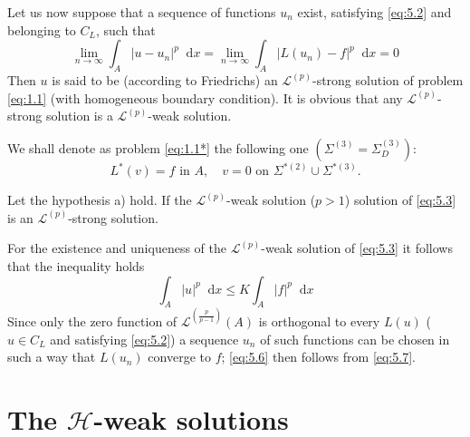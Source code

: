 \documentclass[a4paper,12pt,leqno]{article}
\numberwithin{equation}{section}
\newenvironment{thm}[1]
{\renewcommand\theinnerproblem{#1}\innerproblem}
{\endinnerproblem}
\newcommand{\dd}{\mathop{}\!\mathrm{d}}
\begin{document}
Let us now suppose that a sequence of functions $u_{n}$ exist, satisfying \eqref{eq:5.2} and belonging to $C_{L}$, such that
\begin{equation}
	\label{eq:5.6}
	\lim _{n \rightarrow \infty} \int_{A}\left|u-u_{n}\right|^{p} \dd x=\lim _{n \rightarrow \infty} \int_{A}|L(u_n)-f|^{p} \dd x=0
\end{equation}
Then $u$ is said to be (according to Friedrichs) an $\mathscr{L}^{(p)}$-strong solution of problem \eqref{eq:1.1} (with homogeneous boundary condition). It is obvious that any $\mathscr{L}^{(p)}$-strong solution is a $\mathscr{L}^{(p)}$-weak solution.

We shall denote as problem \eqref{eq:1.1*} the following one $(\Sigma^{(3)}=\Sigma_{D}^{(3)})$:
\begin{equation}
	\label{eq:1.1*}
	\tag{$1.1^*$}
	L^*(v) = f \text{ in } A,
	\quad 
	v = 0 \text{ on } \Sigma^{*(2)} \cup \Sigma^{*(3)}.
\end{equation}

\begin{thm}{XIX} \label{XIX}
	Let the hypothesis a) hold. If the $\mathscr{L}^{(p)}$-weak solution ($p>1$) solution of \eqref{eq:5.3} is an $\mathscr{L}^{(p)}$-strong solution.
\end{thm}

For the existence and uniqueness of the $\mathscr{L}^{(p)}$-weak solution of \eqref{eq:5.3} it follows that the inequality holds
\begin{equation}
	\label{eq:5.7}
	\int_{A}|u|^{p} \dd x \leq K \int_{A}|f|^{p} \dd x
\end{equation}
Since only the zero function of $\mathscr{L}^{\left(\frac{p}{p-1}\right)}(A)$ is orthogonal to every $L(u)$ ($u \in C_{L}$ and satisfying \eqref{eq:5.2}) a sequence $u_{n}$ of such functions can be chosen in such a way that $L\left(u_{n}\right)$ converge to $f$; \eqref{eq:5.6} then follows from \eqref{eq:5.7}.

\section{The \texorpdfstring{$\mathscr{H}$}{H}-weak solutions}
\end{document}
